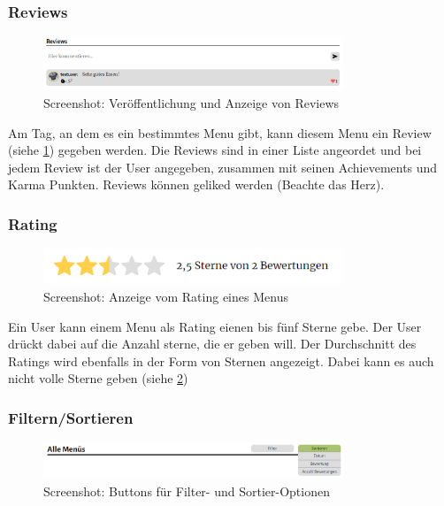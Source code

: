 \subsubsection*{Reviews}

\begin{figure}[ht]
    \centering
    \includegraphics[width=0.8\textwidth]{images/Resultat_Review.png}
    \caption{Screenshot: Veröffentlichung und Anzeige von Reviews}
    \label{fig:r-review}
\end{figure}

Am Tag, an dem es ein bestimmtes Menu gibt, kann diesem Menu ein Review (siehe
\ref{fig:r-review}) gegeben werden. Die Reviews sind in einer Liste angeordet
und bei jedem Review ist der User angegeben, zusammen mit seinen Achievements
und Karma Punkten. Reviews können geliked werden (Beachte das Herz).

\subsubsection*{Rating}

\begin{figure}[ht]
    \centering
    \includegraphics[width=0.8\textwidth]{images/Resultat_Rating.png}
    \caption{Screenshot: Anzeige vom Rating eines Menus}
    \label{fig:r-rating}
\end{figure}

Ein User kann einem Menu als Rating eienen bis fünf Sterne gebe. Der User drückt
dabei auf die Anzahl sterne, die er geben will. Der Durchschnitt des Ratings
wird ebenfalls in der Form von Sternen angezeigt. Dabei kann es auch nicht volle
Sterne geben (siehe \ref{fig:r-rating}) 

\subsubsection*{Filtern/Sortieren}

\begin{figure}[ht]
    \centering
    \includegraphics[width=0.8\textwidth]{images/Resultat_Filter.png}
    \caption{Screenshot: Buttons für Filter- und Sortier-Optionen}
    \label{fig:r-filtersort}
\end{figure}

